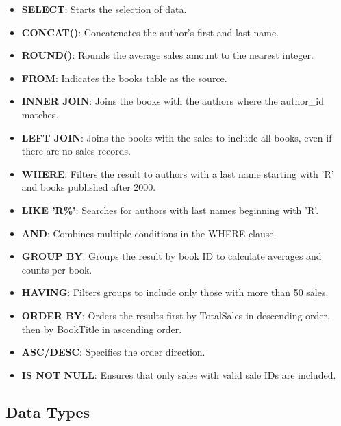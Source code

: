 \begin{itemize}[noitemsep,leftmargin=*]
\leftskip-\dimexpr\leftmargin %
\item[]{\textbf{SELECT}: Starts the selection of data.}
\item[]{\textbf{CONCAT()}: Concatenates the author's first and last name.}
\item[]{\textbf{ROUND()}: Rounds the average sales amount to the nearest integer.}
\item[]{\textbf{FROM}: Indicates the books table as the source.}
\item[]{\textbf{INNER JOIN}: Joins the books with the authors where the author\_id matches.}
\item[]{\textbf{LEFT JOIN}: Joins the books with the sales to include all books, even if there are no sales records.}
\item[]{\textbf{WHERE}: Filters the result to authors with a last name starting with 'R' and books published after 2000.}
\item[]{\textbf{LIKE 'R\%'}: Searches for authors with last names beginning with 'R'.}
\item[]{\textbf{AND}: Combines multiple conditions in the WHERE clause.}
\item[]{\textbf{GROUP BY}: Groups the result by book ID to calculate averages and counts per book.}
\item[]{\textbf{HAVING}: Filters groups to include only those with more than 50 sales.}
\item[]{\textbf{ORDER BY}: Orders the results first by TotalSales in descending order, then by BookTitle in ascending order.}
\item[]{\textbf{ASC/DESC}: Specifies the order direction.}
\item[]{\textbf{IS NOT NULL}: Ensures that only sales with valid sale IDs are included.}
\end{itemize}

\subsection*{Data Types}

